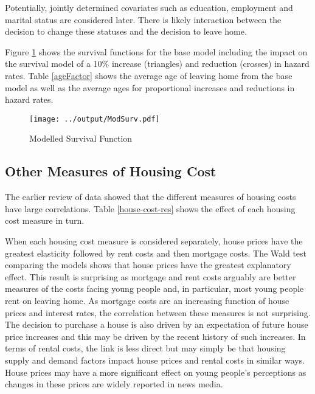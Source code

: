 \documentclass[12pt]{article}
\begin{document}
Potentially, jointly determined covariates such as education, employment and marital status are considered later. There is likely interaction between the decision to change these statuses and the decision to leave home.

Figure \ref{modSurv} shows the survival functions for the base model including the impact on the survival model of a 10\% increase (triangles) and reduction (crosses) in hazard rates. Table \ref{ageFactor} shows the average age of leaving home from the base model as well as the average ages for proportional increases and reductions in hazard rates.

 \begin{figure}[htpb]
   \caption{Modelled Survival Function}
   \label{modSurv}
   \centering
   \texttt{[image: ../output/ModSurv.pdf]}
 \end{figure}

 

\subsection{Other Measures of Housing Cost}
The earlier review of data showed that the different measures of housing costs have large correlations. Table \ref{house-cost-res} shows the effect of each housing cost measure in turn.



When each housing cost measure is considered separately, house prices have the greatest elasticity followed by rent costs and then mortgage costs. The Wald test comparing the models shows that house prices have the greatest explanatory effect. This result is surprising as mortgage and rent costs arguably are better measures of the costs facing young people and, in particular, most young people rent on leaving home. As mortgage costs are an increasing function of house prices and interest rates, the correlation between these measures is not surprising. The decision to purchase a house is also driven by an expectation of future house price increases and this may be driven by the recent history of such increases. In terms of rental costs, the link is less direct but may simply be that housing supply and demand factors impact house prices and rental costs in similar ways.  House prices may have a more significant effect on young people's perceptions as changes in these prices are widely reported in news media.
\end{document}
